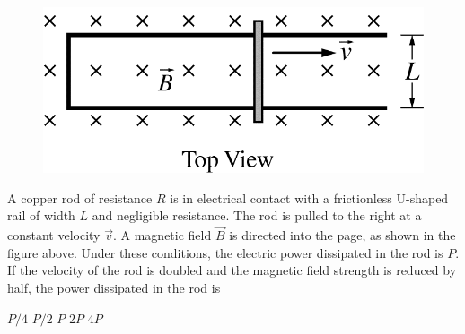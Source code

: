 \begin{figure}[H]
\centering
\includegraphics[scale=0.3]{images/img-006-009.png}
\end{figure}

\begin{questions}\setcounter{question}{8}\question
A copper rod of resistance $R$ is in electrical contact with a frictionless U-shaped rail of width $L$ and negligible resistance. The rod is pulled to the right at a constant velocity $\vec{v}$. A magnetic field $\vec{B}$ is directed into the page, as shown in the figure above. Under these conditions, the electric power dissipated in the rod is $P$. If the velocity of the rod is doubled and the magnetic field strength is reduced by half, the power dissipated in the rod is

\begin{oneparchoices}
\choice $P / 4$
\choice $P / 2$
\choice $P$
\choice $2P$
\choice $4P$
\end{oneparchoices}\end{questions}

